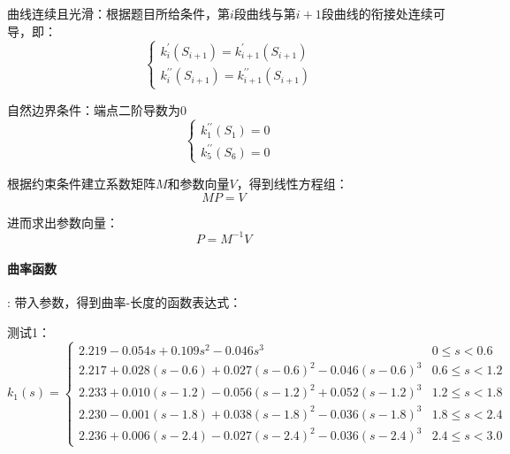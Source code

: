 \documentclass[withoutpreface,bwprint]{cumcmthesis}
\begin{document}
曲线连续且光滑：根据题目所给条件，第$i$段曲线与第$i+1$段曲线的衔接处连续可导，即：
\begin{equation}
\left\{\begin{array}{l}
k_i^{\prime}\left(S_{i+1}\right)=k_{i+1}^{\prime}\left(S_{i+1}\right) \\
k_i^{\prime \prime}\left(S_{i+1}\right)=k_{i+1}^{\prime \prime}\left(S_{i+1}\right)
\end{array}\right.
\end{equation}

自然边界条件：端点二阶导数为0
\begin{equation}
\left\{\begin{array}{l}
k_1^{\prime \prime}\left(S_1\right)=0 \\
k_5^{\prime \prime}\left(S_6\right)=0
\end{array}\right.
\end{equation}

根据约束条件建立系数矩阵$M$和参数向量$V$，得到线性方程组：
\begin{equation}
M P=V\quad
\end{equation}

进而求出参数向量：
\begin{equation}
P=M^{-1} V\quad
\end{equation}

\paragraph{曲率函数}:
带入参数，得到曲率-长度的函数表达式：

测试1：
\begin{equation}
k_1(s) =
\begin{cases}
2.219 - 0.054s + 0.109s^2 - 0.046s^3 & 0 \leqslant s < 0.6 \\
2.217 + 0.028(s - 0.6) + 0.027(s - 0.6)^2 - 0.046(s - 0.6)^3 & 0.6 \leqslant s < 1.2 \\
2.233 + 0.010(s - 1.2) - 0.056(s - 1.2)^2 + 0.052(s - 1.2)^3 & 1.2 \leqslant s < 1.8 \\
2.230 - 0.001(s - 1.8) + 0.038(s - 1.8)^2 - 0.036(s - 1.8)^3 & 1.8 \leqslant s < 2.4 \\
2.236 + 0.006(s - 2.4) - 0.027(s - 2.4)^2 - 0.036(s - 2.4)^3 & 2.4 \leqslant s < 3.0
\end{cases}
\end{equation}
\end{document}
